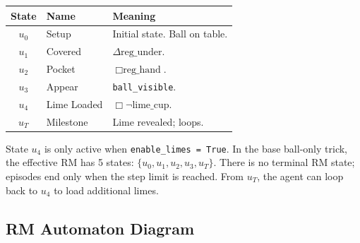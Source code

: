 \documentclass[letterpaper, 10 pt, conference]{ieeeconf}  %
\newcommand{\EBel}[1]{\ensuremath{\Delta #1}} %
\newcommand{\IBel}[1]{\ensuremath{\Box #1}}   %
\begin{document}
\begin{center}
\begin{tabular}{cll}
\toprule
\textbf{State} & \textbf{Name} & \textbf{Meaning} \\
\midrule
$u_0$ & Setup & Initial state. Ball on table. \\
$u_1$ & Covered & $\EBel{\text{reg\_under}}$. \\
$u_2$ & Pocket & $\IBel{\text{reg\_hand}}$. \\
$u_3$ & Appear & \texttt{ball\_visible}. \\
$u_4$ & Lime Loaded & $\IBel{\neg\text{lime\_cup}}$. \\
$u_T$ & Milestone & Lime revealed; loops. \\
\bottomrule
\end{tabular}
\end{center}

State $u_4$ is only active when \texttt{enable\_limes = True}. In the base ball-only trick, the effective RM has 5 states: $\{u_0, u_1, u_2, u_3, u_T\}$. There is no terminal RM state; episodes end only when the step limit is reached. From $u_T$, the agent can loop back to $u_4$ to load additional limes.

\subsection{RM Automaton Diagram}

\begin{center}
\end{center}
\end{document}
